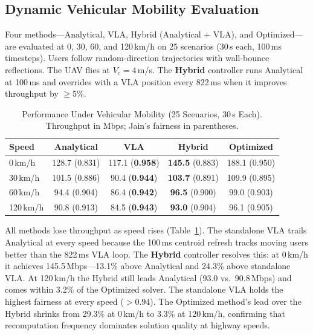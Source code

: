 \documentclass[journal]{IEEEtran}
\begin{document}
\subsection{Dynamic Vehicular Mobility Evaluation}
\label{sec:mobility}

Four methods---Analytical, VLA, Hybrid (Analytical + VLA), and Optimized---are evaluated at 0, 30, 60, and 120\,km/h on 25 scenarios (30\,s each, 100\,ms timesteps). Users follow random-direction trajectories with wall-bounce reflections. The UAV flies at $V_c{=}4$\,m/s. The \textbf{Hybrid} controller runs Analytical at 100\,ms and overrides with a VLA position every 822\,ms when it improves throughput by $\geq$5\%.

\begin{table}[!t]
    \centering
    \caption{Performance Under Vehicular Mobility (25 Scenarios, 30\,s Each). Throughput in Mbps; Jain's fairness in parentheses.}
    \label{tab:mobility}
    \footnotesize
    \begin{tabular}{@{}l@{\hskip 4pt}c@{\hskip 4pt}c@{\hskip 4pt}c@{\hskip 4pt}c@{}}
        \toprule
        \textbf{Speed} & \textbf{Analytical} & \textbf{VLA} & \textbf{Hybrid} & \textbf{Optimized} \\
        \midrule
        0\,km/h & 128.7 (0.831) & 117.1 (\textbf{0.958}) & \textbf{145.5} (0.883) & 188.1 (0.950) \\
        30\,km/h & 101.5 (0.886) & 90.4 (\textbf{0.944}) & \textbf{103.7} (0.891) & 109.9 (0.895) \\
        60\,km/h & 94.4 (0.904) & 86.4 (\textbf{0.942}) & \textbf{96.5} (0.900) & 99.0 (0.903) \\
        120\,km/h & 90.8 (0.913) & 84.5 (\textbf{0.943}) & \textbf{93.0} (0.904) & 96.1 (0.905) \\
        \bottomrule
    \end{tabular}
\end{table}

All methods lose throughput as speed rises (Table~\ref{tab:mobility}). The standalone VLA trails Analytical at every speed because the 100\,ms centroid refresh tracks moving users better than the 822\,ms VLA loop. The \textbf{Hybrid} controller resolves this: at 0\,km/h it achieves 145.5\,Mbps---13.1\% above Analytical and 24.3\% above standalone VLA. At 120\,km/h the Hybrid still leads Analytical (93.0 vs.\ 90.8\,Mbps) and comes within 3.2\% of the Optimized solver. The standalone VLA holds the highest fairness at every speed ($>$0.94). The Optimized method's lead over the Hybrid shrinks from 29.3\% at 0\,km/h to 3.3\% at 120\,km/h, confirming that recomputation frequency dominates solution quality at highway speeds.
\end{document}

